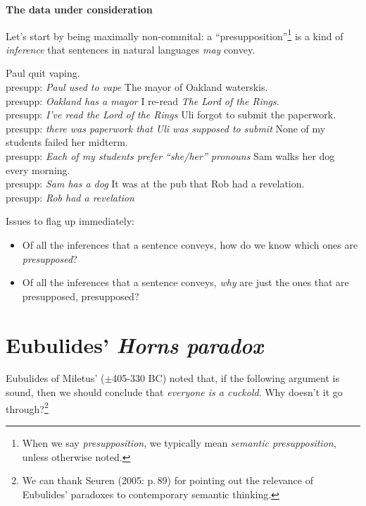 \documentclass[cronos,landscape,paper=letter]{ling-handout}
\begin{document}
\textbf{The data under consideration}

Let's start by being maximally non-commital: a \enquote{presupposition}\footnote{When we say \textit{presupposition}, we typically mean \textit{semantic presupposition}, unless otherwise noted.} is a kind of \textit{inference} that sentences in natural languages \textit{may} convey.

\pex
\a Paul quit vaping.\\
presupp: \textit{Paul used to vape}
\a The mayor of Oakland waterskis.\\
presupp: \textit{Oakland has a mayor}
\a I re-read \textit{The Lord of the Rings}.\\
presupp: \textit{I've read the Lord of the Rings}
\a Uli forgot to submit the paperwork.\\
presupp: \textit{there was paperwork that Uli was supposed to submit}
\a None of my students failed her midterm.\\
presupp: \textit{Each of my students prefer \enquote{she/her} pronouns}
\a Sam walks her dog every morning.\\
presupp: \textit{Sam has a dog}
\a It was at the pub that Rob had a revelation.\\
presupp: \textit{Rob had a revelation}
\xe

Issues to flag up immediately:

\begin{itemize}

  \item Of all the inferences that a sentence conveys, how do we know which ones are \textit{presupposed}?

  \item Of all the inferences that a sentence conveys, \textit{why} are just the ones that are presupposed, presupposed?

\end{itemize}

\section{Eubulides' \textit{Horns paradox}}

Eubulides of Miletus' ($±$405-330 BC) noted that, if the following argument is sound, then we should conclude that \textit{everyone is a cuckold}. Why doesn't it go through?\footnote{We can thank Seuren (2005: p.\,89) for pointing out the relevance of Eubulides' paradoxes to contemporary semantic thinking.}
\end{document}
